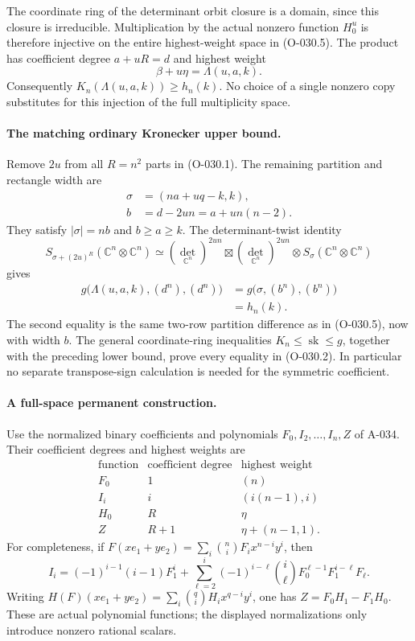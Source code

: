 The coordinate ring of the determinant orbit closure
is a domain, since this closure is irreducible.
Multiplication by the actual nonzero function \(H_0^u\)
is therefore injective on the entire highest-weight space
in (O-030.5). The product has coefficient degree
\(a+uR=d\) and highest weight
\[
                           \beta+u\eta=\Lambda(u,a,k).
\]
Consequently \(K_n(\Lambda(u,a,k))\geq h_n(k)\).
No choice of a single nonzero copy substitutes for this
injection of the full multiplicity space.

\paragraph{The matching ordinary Kronecker upper bound.}
Remove \(2u\) from all \(R=n^2\) parts in (O-030.1).
The remaining partition and rectangle width are
\[
 \begin{split}
 \sigma&=(na+uq-k,k),\\
 b&=d-2un=a+un(n-2).
 \end{split}
\]
They satisfy \(|\sigma|=nb\) and \(b\geq a\geq k\).
The determinant-twist identity
\[
 S_{\sigma+(2u)^R}(\mathbb C^n\otimes\mathbb C^n)
   \simeq
 (\det_{\mathbb C^n})^{2un}\boxtimes
 (\det_{\mathbb C^n})^{2un}
        \otimes S_\sigma(\mathbb C^n\otimes\mathbb C^n)
\]
gives
\[
 \begin{split}
 g\bigl(\Lambda(u,a,k),(d^n),(d^n)\bigr)
   &=g\bigl(\sigma,(b^n),(b^n)\bigr)\\
   &=h_n(k).
 \end{split}                                                   \tag{O-030.6}
\]
The second equality is the same two-row partition
difference as in (O-030.5), now with width \(b\).
The general coordinate-ring inequalities
\(K_n\leq\operatorname{sk}\leq g\), together with the
preceding lower bound, prove every equality in
(O-030.2). In particular no separate transpose-sign
calculation is needed for the symmetric coefficient.

\paragraph{A full-space permanent construction.}
Use the normalized binary coefficients and polynomials
\(F_0,I_2,\ldots,I_n,Z\) of A-034. Their coefficient
degrees and highest weights are
\[
 \begin{array}{c|c|c}
 \text{function}&\text{coefficient degree}&\text{highest weight}\\ \hline
 F_0&1&(n)\\
 I_i&i&(i(n-1),i)\\
 H_0&R&\eta\\
 Z&R+1&\eta+(n-1,1).
 \end{array}                                                   \tag{O-030.7}
\]
For completeness, if
\(F(xe_1+ye_2)=\sum_i\binom niF_i x^{n-i}y^i\), then
\[
 I_i=(-1)^{i-1}(i-1)F_1^i+
       \sum_{\ell=2}^{i}(-1)^{i-\ell}\binom i\ell
                  F_0^{\ell-1}F_1^{i-\ell}F_\ell.
\]
Writing
\(H(F)(xe_1+ye_2)=\sum_i\binom qiH_i x^{q-i}y^i\),
one has \(Z=F_0H_1-F_1H_0\).
These are actual polynomial functions; the displayed
normalizations only introduce nonzero rational scalars.


